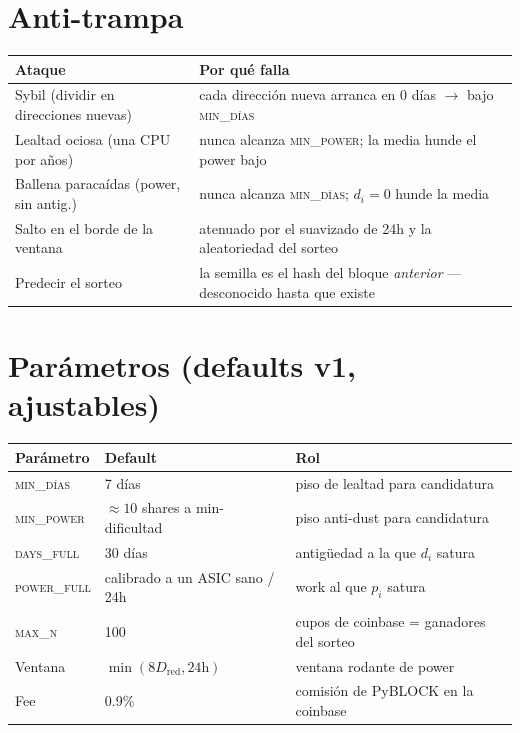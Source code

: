 \documentclass[11pt]{article}
\begin{document}
\section{Anti-trampa}
\begin{center}
\begin{tabular}{@{}ll@{}}
\toprule
\textbf{Ataque} & \textbf{Por qu\'e falla} \\
\midrule
Sybil (dividir en direcciones nuevas) & cada direcci\'on nueva arranca en 0 d\'ias $\rightarrow$ bajo \textsc{min\_d\'ias} \\
Lealtad ociosa (una CPU por a\~nos) & nunca alcanza \textsc{min\_power}; la media hunde el power bajo \\
Ballena paraca\'idas (power, sin antig.) & nunca alcanza \textsc{min\_d\'ias}; $d_i = 0$ hunde la media \\
Salto en el borde de la ventana & atenuado por el suavizado de 24h y la aleatoriedad del sorteo \\
Predecir el sorteo & la semilla es el hash del bloque \emph{anterior} --- desconocido hasta que existe \\
\bottomrule
\end{tabular}
\end{center}

\section{Par\'ametros (defaults v1, ajustables)}
\begin{center}
\begin{tabular}{@{}lll@{}}
\toprule
\textbf{Par\'ametro} & \textbf{Default} & \textbf{Rol} \\
\midrule
\textsc{min\_d\'ias}  & 7 d\'ias & piso de lealtad para candidatura \\
\textsc{min\_power}  & $\approx 10$ shares a min-dificultad & piso anti-dust para candidatura \\
\textsc{days\_full}  & 30 d\'ias & antig\"uedad a la que $d_i$ satura \\
\textsc{power\_full} & calibrado a un ASIC sano / 24h & work al que $p_i$ satura \\
\textsc{max\_n}      & 100 & cupos de coinbase = ganadores del sorteo \\
Ventana              & $\min(8 D_{\text{red}}, 24\text{h})$ & ventana rodante de power \\
Fee                  & 0.9\% & comisi\'on de PyBLOCK en la coinbase \\
\bottomrule
\end{tabular}
\end{center}
\end{document}
